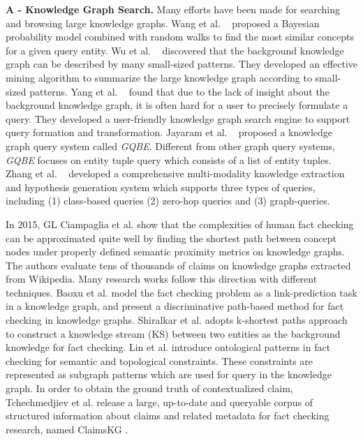 
{\bf A - Knowledge Graph Search.} Many efforts have been made for searching and browsing large knowledge graphs. 
Wang et al. ~\cite{Wang2015QUT} proposed a Bayesian probability model combined with random walks to find the most similar concepts for a given query entity.
Wu et al. ~\cite{YinghuiWu} discovered that the background knowledge graph can be described by many small-sized patterns. 
They developed an effective mining algorithm to summarize the large knowledge graph according to small-sized patterns.
Yang et al. ~\cite{Yang2014vldb} found that due to the lack of insight about the background knowledge graph, it is often hard for a user to precisely formulate a query. They developed a user-friendly knowledge graph search engine to support query formation and transformation. 
Jayaram et al. ~\cite{GQBE} proposed a knowledge graph query system called {\em GQBE}. Different from other graph query systems, {\em GQBE} focuses on entity tuple query which consists of a list of entity tuples.
Zhang et al. ~\cite{tongtao2018Gaia} developed a comprehensive multi-modality knowledge extraction and hypothesis generation system which supports three types of queries, including (1) class-based queries %
(2) zero-hop queries %
and (3) graph-queries. %

 In 2015, GL Ciampaglia et al. \cite{ciampaglia2015computational} show that the complexities of human fact checking can be approximated quite well by finding the shortest path between concept nodes under properly defined semantic proximity metrics on knowledge graphs. The authors evaluate tens of thousands of claims on knowledge graphs extracted from Wikipedia. Many research works follow this direction with different techniques. Baoxu et al. \cite{shi2016discriminative} model the fact checking problem as a link-prediction task in a knowledge graph, and present a discriminative path-based method for fact checking in knowledge graphs. Shiralkar et al. \cite{shiralkar2017finding} adopts k-shortest paths approach to construct a knowledge stream (KS) between two entities as the background knowledge for fact checking. Lin et al. \cite{lin2018fact} introduce ontological patterns in fact checking for semantic and topological constraints. These constraints are represented as subgraph patterns which are used for query in the knowledge graph. In order to obtain the ground truth of contextualized claim, Tchechmedjiev et al. release a large, up-to-date and queryable corpus of structured information about claims and related metadata for fact checking research, named ClaimsKG \cite{tchechmedjiev2019claimskg}. 


